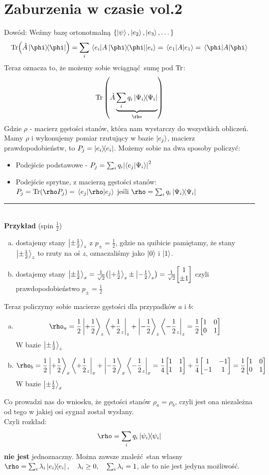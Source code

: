 \documentclass[12pt,a4paper]{report}
\renewcommand{\emph}{\textbf}
\newcommand{\linediv}{{\color{RubineRed} \rule{\linewidth}{0.5mm}}}
\newenvironment{lecture}[1]{\par\medskip
   \noindent\chapter{#1} \rmfamily}{\medskip}
\begin{document}
\begin{lecture}{Zaburzenia w czasie vol.2}
    Dowód:
    Weźmy bazę ortonotmalną $\qty{\ket{\psi}, \ket{e_2}, \ket{e_3}, \dots}$
    \[
        \Tr (\hat{A} \ketbra{\phi}) = \sum_i \ev{A \ketbra{\phi}}{e_i} = \ev{A}{e_1} = \ev{A}{\phi}   
    \]
    Teraz oznacza to, że możemy sobie wciągnąć sumę pod $\Tr$:
    \[
        \Tr\qty(\hat{A} \underbrace{\sum_i q_i \ketbra{\Psi_i}}_{\rho})    
    \]
    Gdzie $\rho$ - macierz gęstości stanów, która nam wystarczy do wszystkich obliczeń.\\

    Mamy $\rho$ i wykonujemy pomiar rzutujący w bazie $\ket{e_j}$, macierz prawdopodobieństw, to $P_j = \ketbra{e_i}$.
    Możemy sobie na dwa sposoby policzyć:
    \begin{itemize}
        \item Podejście podstawowe - $P_j = \sum_i q_i \abs{\braket{e_j}{\Psi_i}}^2$
        \item Podejście sprytne, z macierzą gęstości stanów: $P_j = \Tr (\rho P_j) = \ev{\rho}{e_j}$ jeśli $\rho = \sum_i q_i \ketbra{\Psi_i}$
    \end{itemize}

    \linediv\\

    \emph{Przykład} (spin $\frac12$)
    \begin{enumerate}[a)]
        \item dostajemy stany $\ket{\pm \frac12}_z$ z $p_{\pm} = \frac12$, gdzie na quibicie pamiętamy, że stany $\ket{\pm \frac12}_z$ to rzuty na oś $z$, oznaczaliśmy jako $\ket{0}$ i $\ket{1}$.
        \item dostajemy stany $\ket{\pm \frac12}_x = \frac{1}{\sqrt{2}} \qty(\ket{+\frac12}_z \pm \ket{- \frac12}_z) = \frac{1}{\sqrt{2}} \mqty[1 \\ \pm 1]$ czyli prawdopodobieństwo $p_{\pm} = \frac12$
    \end{enumerate}
    Teraz policzymy sobie macierze gęstości dla przypadków $a$ i $b$:
    \begin{enumerate}[a)]
        \item
        \[
            \rho_a = \frac12 \ket{+\frac12}_z \bra{+\frac12_z}_z + \ket{-\frac12}_z \bra{-\frac12_z}_z = \frac12 \mqty[1 & 0 \\ 0 & 1]
        \]
        W bazie $\ket{\pm \frac12}_z$
        \item
        \[
            \rho_b = \frac12 \ket{+\frac12}_x \bra{+\frac12_z}_x + \ket{-\frac12}_x \bra{-\frac12_z}_x = \frac14 \mqty[1 & 1 \\ 1 & 1] + \frac14 \mqty[1 & -1 \\ -1 & 1]= \frac12 \mqty[1 & 0 \\ 0 & 1]
        \]
        W bazie $\ket{\pm \frac12}_x$
    \end{enumerate}
    Co prowadzi nas do wniosku, że gęstości stanów $\rho_a = \rho_b$, czyli jest ona niezależna od tego w jakiej osi sygnał został wysłany.\\
    Czyli rozkład:
    \[
        \rho = \sum_i q_i \ketbra{\psi_i}    
    \]
    \emph{nie jest} jednoznaczny. Można zawsze znaleźć stan własny $\rho = \sum_i \lambda_i \ketbra{e_i}\qc \lambda_i \geq 0\qc \sum_i \lambda_i = 1$, ale to nie jest jedyna możliwość.


\end{lecture}
\end{document}
